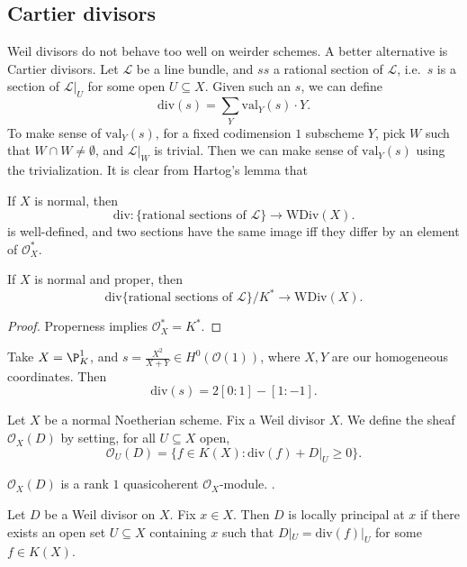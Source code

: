 \documentclass[a4paper]{article}
\newcommand\val{\mathrm{val}}
\renewcommand\div{\mathrm{div}}
\newcommand\WDiv{\mathrm{WDiv}}
\begin{document}
\subsection{Cartier divisors}
Weil divisors do not behave too well on weirder schemes. A better alternative is Cartier divisors. Let $\mathcal{L}$ be a line bundle, and $ss$ a rational section of $\mathcal{L}$, i.e.\ $s$ is a section of $\mathcal{L}|_U$ for some open $U \subseteq X$. Given such an $s$, we can define
\[
  \div(s) = \sum_Y \val_Y(s) \cdot Y.
\]
To make sense of $\val_Y(s)$, for a fixed codimension $1$ subscheme $Y$, pick $W$ such that $W \cap W \not= \emptyset$, and $\mathcal{L}|_W$ is trivial. Then we can make sense of $\val_Y(s)$ using the trivialization. It is clear from Hartog's lemma that
\begin{prop}
  If $X$ is normal, then
  \[
    \div: \{\text{rational sections of }\mathcal{L}\} \to \WDiv(X).
  \]
  is well-defined, and two sections have the same image iff they differ by an element of $\mathcal{O}_X^*$.
\end{prop}

\begin{cor}
  If $X$ is normal and proper, then
  \[
    \div \{\text{rational sections of }\mathcal{L}\}/K^* \to \WDiv(X).
  \]
\end{cor}

\begin{proof}
  Properness implies $\mathcal{O}_X^* = K^*$.
\end{proof}

\begin{eg}
  Take $X = \P^1_K$, and $s = \frac{X^2}{X + Y} \in H^0(\mathcal{O}(1))$, where $X, Y$ are our homogeneous coordinates. Then
  \[
    \div(s) = 2[0:1] - [1:-1].
  \]
\end{eg}

Let $X$ be a normal Noetherian scheme. Fix a Weil divisor $X$. We define the sheaf $\mathcal{O}_X(D)$ by setting, for all $U \subseteq X$ open,
\[
  \mathcal{O}_U(D) = \{f \in K(X) : \div(f) + D |_U \geq 0\}.
\]
\begin{prop}
  $\mathcal{O}_X(D)$ is a rank $1$ quasicoherent $\mathcal{O}_X$-module. \fakeqed.
\end{prop}

\begin{defi}
  Let $D$ be a Weil divisor on $X$. Fix $x \in X$. Then $D$ is locally principal at $x$ if there exists an open set $U \subseteq X$ containing $x$ such that $D|_U = \div(f)|_U$ for some $f \in K(X)$.
\end{defi}
\end{document}
